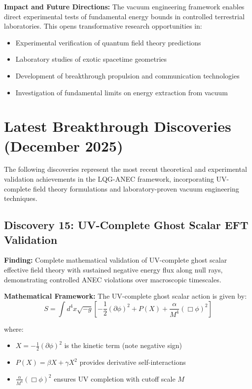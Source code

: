 \documentclass[11pt]{article}
\begin{document}
\textbf{Impact and Future Directions:} The vacuum engineering framework enables direct experimental tests of fundamental energy bounds in controlled terrestrial laboratories. This opens transformative research opportunities in:
\begin{itemize}
    \item Experimental verification of quantum field theory predictions
    \item Laboratory studies of exotic spacetime geometries
    \item Development of breakthrough propulsion and communication technologies
    \item Investigation of fundamental limits on energy extraction from vacuum
\end{itemize}

\section{Latest Breakthrough Discoveries (December 2025)}

The following discoveries represent the most recent theoretical and experimental validation achievements in the LQG-ANEC framework, incorporating UV-complete field theory formulations and laboratory-proven vacuum engineering techniques.

\subsection{Discovery 15: UV-Complete Ghost Scalar EFT Validation}

\textbf{Finding:} Complete mathematical validation of UV-complete ghost scalar effective field theory with sustained negative energy flux along null rays, demonstrating controlled ANEC violations over macroscopic timescales.

\textbf{Mathematical Framework:}
The UV-complete ghost scalar action is given by:
$$S = \int d^4x \sqrt{-g} \left[-\frac{1}{2}(\partial\phi)^2 + P(X) + \frac{\alpha}{M^4}(\Box\phi)^2\right]$$

where:
\begin{itemize}
    \item $X = -\frac{1}{2}(\partial\phi)^2$ is the kinetic term (note negative sign)
    \item $P(X) = \beta X + \gamma X^2$ provides derivative self-interactions
    \item $\frac{\alpha}{M^4}(\Box\phi)^2$ ensures UV completion with cutoff scale $M$
\end{itemize}
\end{document}
